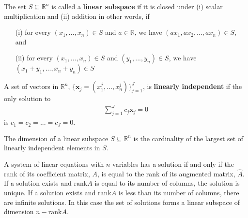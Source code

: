 \documentclass[compress]{beamer}
\newcommand{\rank}{\mathrm{rank}}
\theoremstyle{definition}
\begin{document}
\begin{frame}
  \begin{definition}
    The set $S \subseteq \mathbb{R}^n$ is called a \textbf{linear
      subspace} if it is closed under (i) scalar multiplication and (ii)
    addition in other words, if 
    \begin{itemize}
    \item[(i)] for every $(x_1, ..., x_n)\in S$ and $a \in \mathbb{R}$,
      we have $(a x_1, a x_2, ..., a x_n) \in S$, and
    \item[(ii)] for every $(x_1, ..., x_n)\in S$ and $(y_1, ..., y_n)\in
      S$, we have
      $(x_1 + y_1, ..., x_n + y_n)  \in S$
    \end{itemize}
  \end{definition}
\end{frame}

\begin{frame}
  \begin{definition}
    A set of vectors in $\mathbb{R}^n$, $\{\textbf{x}_j = (x^j_1,...,
    x^j_n)\}_{j=1}^J$, is \textbf{linearly independent} if the only
    solution to 
    \begin{align*}
      \sum_{j=1}^J c_j \textbf{x}_j = 0 
    \end{align*}
    is $c_1 = c_2 = ... = c_J = 0$. 
  \end{definition}

  \begin{definition}
    The dimension of a linear subspace $S \subseteq \mathbb{R}^n$ is the
    cardinality of the largest set of linearly independent elements in
    $S$. 
  \end{definition} 
\end{frame}

\begin{frame}
  \begin{theorem} \label{thm:rc} A system of linear
    equations with $n$ variables has a solution if and only if the rank
    of its coefficient matrix, $A$, is equal to the rank of its
    augmented matrix, $\hat{A}$. If a solution exists and $\rank A$ is
    equal to its number of columns, the solution is unique. If a
    solution exists and $\rank A$ is less than its number of columns,
    there are infinite solutions. In this case the set of solutions
    forms a linear subspace of dimension $n - \rank A$.
  \end{theorem}
\end{frame}
\end{document}
